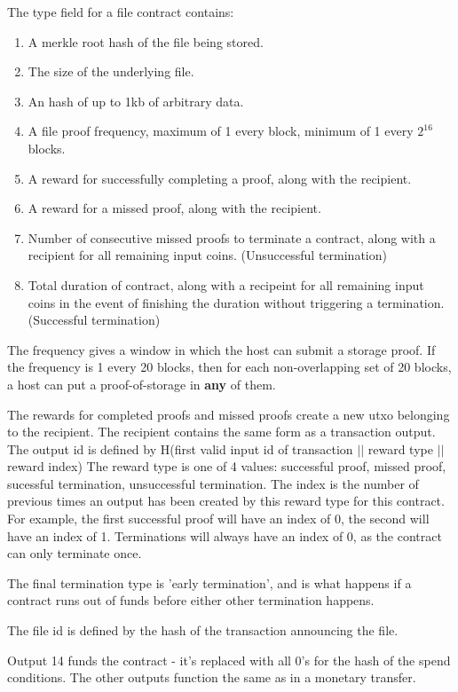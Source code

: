 \documentclass[twocolumn]{article}
\begin{document}
The type field for a file contract contains:
\begin{enumerate}
	\item A merkle root hash of the file being stored.
	\item The size of the underlying file.
	\item An hash of up to 1kb of arbitrary data.
	\item A file proof frequency, maximum of 1 every block, minimum of 1 every $2^{16}$ blocks.
	\item A reward for successfully completing a proof, along with the recipient.
	\item A reward for a missed proof, along with the recipient.
	\item Number of consecutive missed proofs to terminate a contract, along with a recipient for all remaining input coins. (Unsuccessful termination)
	\item Total duration of contract, along with a recipeint for all remaining input coins in the event of finishing the duration without triggering a termination. (Successful termination)
\end{enumerate}

The frequency gives a window in which the host can submit a storage proof.
If the frequency is 1 every 20 blocks, then for each non-overlapping set of 20 blocks, a host can put a proof-of-storage in \textbf{any} of them.

The rewards for completed proofs and missed proofs create a new utxo belonging to the recipient.
The recipient contains the same form as a transaction output.
The output id is defined by H(first valid input id of transaction $||$ reward type $||$ reward index)
The reward type is one of 4 values: successful proof, missed proof, sucessful termination, unsuccessful termination.
The index is the number of previous times an output has been created by this reward type for this contract.
For example, the first successful proof will have an index of 0, the second will have an index of 1.
Terminations will always have an index of 0, as the contract can only terminate once.

The final termination type is 'early termination', and is what happens if a contract runs out of funds before either other termination happens.

The file id is defined by the hash of the transaction announcing the file.

Output 14 funds the contract - it's replaced with all 0's for the hash of the spend conditions.
The other outputs function the same as in a monetary transfer.
\end{document}

